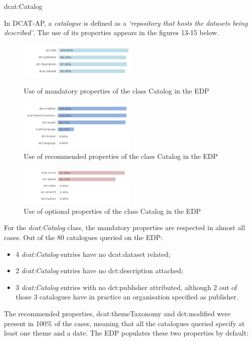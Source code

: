 \documentclass[<options>]{elsarticle}
\begin{document}
dcat:Catalog

In DCAT-AP, a \textit{catalogue} is defined as a \textit{‘repository that hosts the datasets being described’}. The use of its properties appears in the figures 13-15 below.

\begin{figure}[!h]
\includegraphics{replace16.png}
\caption{Use of mandatory properties of the class Catalog in the EDP}
\includegraphics{replace17.png}
\caption{Use of recommended properties of the class Catalog in the EDP}
\end{figure}

\begin{figure}[!h]
\includegraphics{replace18.png}
\caption{Use of optional properties of the class Catalog in the EDP}
\end{figure}

For the \textit{dcat:Catalog} class, the mandatory properties are respected in almost all cases. Out of the 80 catalogues queried on the EDP:

\begin{itemize}
\item 4 \textit{dcat:Catalog} entries have no dcat:dataset related;
\item 2 \textit{dcat:Catalog} entries have no dct:description attached; 
\item 3 \textit{dcat:Catalog} entries with no dct:publisher attributed, although 2 out of those 3 catalogues have in practice an organisation specified as publisher.
\end{itemize}

The recommended properties, dcat:themeTaxonomy and dct:modified were present in 100\% of the cases, meaning that all the catalogues queried specify at least one theme and a date. The EDP populates these two properties by default:
\end{document}
